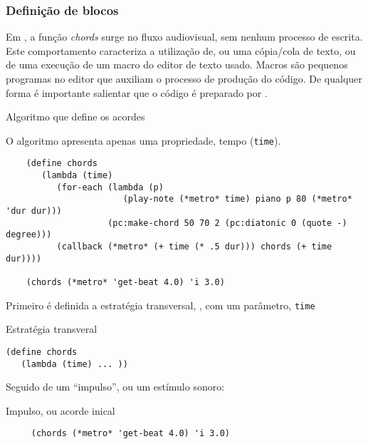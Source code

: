\subsubsection {Definição de blocos}\label{sec:define_chords}

Em , a função \emph{chords} surge no fluxo audiovisual, sem nenhum processo de escrita. Este comportamento caracteriza a utilização de, ou uma cópia/cola de texto, ou de uma execução de um macro do editor de texto usado. Macros são pequenos programas no editor que auxiliam o processo de produção do código. De qualquer forma é importante salientar que o código é preparado por .

\begin{example}{Algoritmo que define os acordes}

O algoritmo apresenta apenas uma propriedade, tempo (\verb|time|).

\begin{verbatim}
    (define chords
       (lambda (time)
          (for-each (lambda (p)
                       (play-note (*metro* time) piano p 80 (*metro* 'dur dur)))                                 
                    (pc:make-chord 50 70 2 (pc:diatonic 0 (quote -) degree)))
          (callback (*metro* (+ time (* .5 dur))) chords (+ time dur))))

    (chords (*metro* 'get-beat 4.0) 'i 3.0)
\end{verbatim}
\end{example}

Primeiro é definida a estratégia transversal, , com um parâmetro, \verb|time|

\begin{example}{Estratégia transveral}
\begin{verbatim}
(define chords
   (lambda (time) ... ))
\end{verbatim}
\end{example}

Seguido de um ``impulso'', ou um estímulo sonoro:

\begin{example}{Impulso, ou acorde inical}
\begin{verbatim}
     (chords (*metro* 'get-beat 4.0) 'i 3.0)
\end{verbatim}
\end{example}

